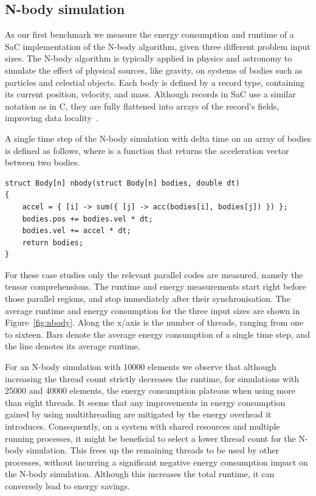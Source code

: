 \subsection{N-body simulation}
As our first benchmark we measure the energy consumption and runtime of a SaC implementation of the N-body algorithm, given three different problem input sizes.
The N-body algorithm is typically applied in physics and astronomy to simulate the effect of physical sources, like gravity, on systems of bodies such as particles and celestial objects.
Each body is defined by a record type, containing its current position, velocity, and mass.
Although records in SaC use a similar notation as in C, they are fully flattened into arrays of the record's fields, improving data locality~\cite{huijben2025flattening}.

A single time step of the N-body simulation with delta time  on an array of bodies is defined as follows, where  is a function that returns the acceleration vector between two bodies.
\begin{verbatim}
struct Body[n] nbody(struct Body[n] bodies, double dt)
{
    accel = { [i] -> sum({ [j] -> acc(bodies[i], bodies[j]) }) };
    bodies.pos += bodies.vel * dt;
    bodies.vel += accel * dt;
    return bodies;
}
\end{verbatim}

For these case studies only the relevant parallel codes are measured, namely the tensor comprehensions.
The runtime and energy measurements start right before those parallel regions, and stop immediately after their synchronisation.
The average runtime and energy consumption for the three input sizes are shown in Figure~\ref{fig:nbody}.
Along the x\-/axis is the number of threads, ranging from one to sixteen.
Bars denote the average energy consumption of a single time step, and the line denotes its average runtime.

For an N-body simulation with \num{10000} elements we observe that although increasing the thread count strictly decreases the runtime, for simulations with \num{25000} and \num{40000} elements, the energy consumption plateaus when using more than eight threads.
It seems that any improvements in energy consumption gained by using multithreading are mitigated by the energy overhead it introduces.
Consequently, on a system with shared resources and multiple running processes, it might be beneficial to select a lower thread count for the N-body simulation.
This frees up the remaining threads to be used by other processes, without incurring a significant negative energy consumption impact on the N-body simulation.
Although this increases the total runtime, it can conversely lead to energy savings.

